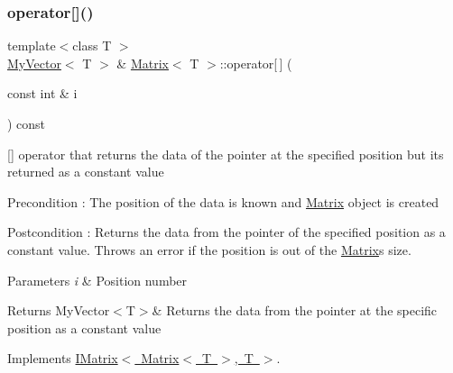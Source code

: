 \mbox{\label{class_matrix_a56c7f18f272e74bee2b616eba702fc87}} 
\subsubsection{\texorpdfstring{operator[]()}{operator[]()}\hspace{0.1cm}{\footnotesize\ttfamily [2/2]}}
{\footnotesize\ttfamily template$<$class T $>$ \\
\mbox{\hyperlink{class_my_vector}{My\+Vector}}$<$ T $>$ \& \mbox{\hyperlink{class_matrix}{Matrix}}$<$ T $>$\+::operator\mbox{[}$\,$\mbox{]} (\begin{DoxyParamCaption}\item[{const int \&}]{i }\end{DoxyParamCaption}) const\hspace{0.3cm}{\ttfamily [virtual]}}



\mbox{[}\mbox{]} operator that returns the data of the pointer at the specified position but its returned as a constant value 

\begin{DoxyPrecond}{Precondition}
\+: The position of the data is known and \mbox{\hyperlink{class_matrix}{Matrix}} object is created 
\end{DoxyPrecond}
\begin{DoxyPostcond}{Postcondition}
\+: Returns the data from the pointer of the specified position as a constant value. Throws an error if the position is out of the \mbox{\hyperlink{class_matrix}{Matrix}}\textquotesingle{}s size. 
\end{DoxyPostcond}

\begin{DoxyParams}{Parameters}
{\em i} & Position number \\
\hline
\end{DoxyParams}
\begin{DoxyReturn}{Returns}
My\+Vector$<$\+T$>$\& Returns the data from the pointer at the specific position as a constant value 
\end{DoxyReturn}


Implements \mbox{\hyperlink{class_i_matrix_a1ed62ee6700728045083c7f0df3e3e62}{I\+Matrix$<$ Matrix$<$ T $>$, T $>$}}.

\mbox{\label{class_matrix_af61aaa671b6bd354b27fb3aabbb65a9d}} 
